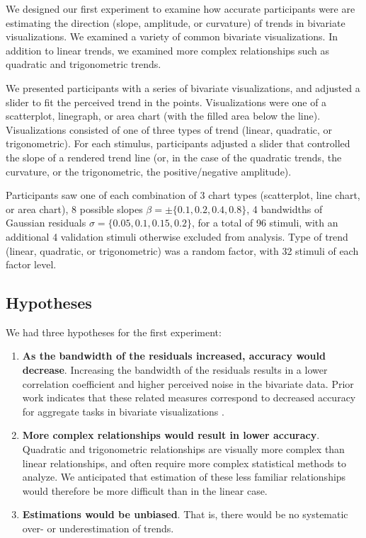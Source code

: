 \documentclass{sigchi}
\begin{document}
We designed our first experiment to examine how accurate participants were are estimating the direction (slope, amplitude, or curvature) of trends in bivariate visualizations. We examined a variety of common bivariate visualizations. In addition to linear trends, we examined more complex relationships such as quadratic and trigonometric trends.

We presented participants with a series of bivariate visualizations, and adjusted a slider to fit the perceived trend in the points. Visualizations were one of a scatterplot, linegraph, or area chart (with the filled area below the line). Visualizations consisted of one of three types of trend (linear, quadratic, or trigonometric). For each stimulus, participants adjusted a slider that controlled the slope of a rendered trend line (or, in the case of the quadratic trends, the curvature, or the trigonometric, the positive/negative amplitude). 

Participants saw one of each combination of 3 chart types (scatterplot, line chart, or area chart), 8 possible slopes $\beta = \pm \{0.1,0.2,0.4,0.8\}$, 4 bandwidths of Gaussian residuals $\sigma = \{0.05,0.1,0.15,0.2\}$, for a total of 96 stimuli, with an additional 4 validation stimuli otherwise excluded from analysis. Type of trend (linear, quadratic, or trigonometric) was a random factor, with 32 stimuli of each factor level.

\subsection{Hypotheses}

We had three hypotheses for the first experiment:
\begin{enumerate}
	\item \textbf{As the bandwidth of the residuals increased, accuracy would decrease}. Increasing the bandwidth of the residuals results in a lower correlation coefficient and higher perceived noise in the bivariate data. Prior work indicates that these related measures correspond to decreased accuracy for aggregate tasks in bivariate visualizations \cite{albers2014task,harrison2014ranking}. 
	\item \textbf{More complex relationships would result in lower accuracy}. Quadratic and trigonometric relationships are visually more complex than linear relationships, and often require more complex statistical methods to analyze. We anticipated that estimation of these less familiar relationships would therefore be more difficult than in the linear case.
	\item \textbf{Estimations would be unbiased}. That is, there would be no systematic over- or underestimation of trends. 
\end{enumerate}
\end{document}
